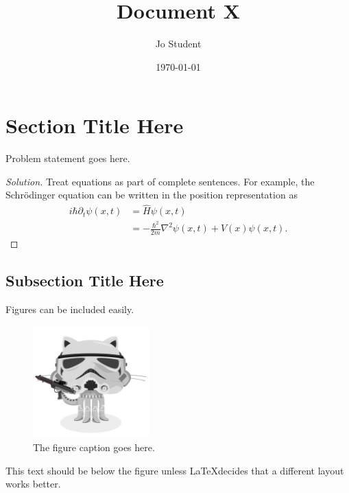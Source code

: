 \documentclass[aps,pra,notitlepage,amsmath,amssymb,letterpaper,12pt]{revtex4-1}
\newenvironment{problem}[2][Problem]{\begin{trivlist}
\item[\hskip \labelsep {\bfseries #1}\hskip \labelsep {\bfseries #2.}]}{\end{trivlist}}
\newenvironment{solution}{\begin{proof}[Solution]}{\end{proof}}
\begin{document}
 
\title{Document X}
\author{Jo Student}
\date{\today}

\maketitle

\section{Section Title Here} %

\begin{problem}{x.yz} 
Problem statement goes here.
\end{problem}
 
\begin{solution} %
Treat equations as part of complete sentences.  For example, the Schr\"odinger equation can be written in the position representation as
\begin{align}
i\hbar \partial_t \psi(x,t) &= \hat{H}\psi(x,t) \\
&= -\frac{\hbar^2}{2m}\nabla^2\psi(x,t) + V(x)\psi(x,t). \nonumber
\end{align}
\end{solution}

\subsection{Subsection Title Here} %

Figures can be included easily.

\begin{figure}[h!] %
  \includegraphics[width=0.4\textwidth]{stormtroopocat.jpg}  %
  \caption{The figure caption goes here.}
  \label{fig:figlabel}
\end{figure}

This text should be below the figure unless \LaTeX  decides that a different layout works better.
 
 
\end{document}
